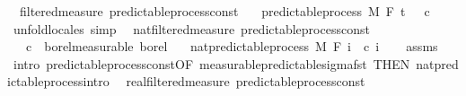 \begin{isabellebody}
%
\isadelimproof
\isanewline
%
\endisadelimproof
\isanewline
{}\isamarkupfalse%
\ {\isacharparenleft}{\kern0pt}\ filtered{\isacharunderscore}{\kern0pt}measure{\isacharparenright}{\kern0pt}\ predictable{\isacharunderscore}{\kern0pt}process{\isacharunderscore}{\kern0pt}const{\isacharprime}{\kern0pt}{\isacharcolon}{\kern0pt}\isanewline
\ \ \ {\isachardoublequoteopen}predictable{\isacharunderscore}{\kern0pt}process\ M\ F\ t\ {\isacharparenleft}{\kern0pt}{\isasymlambda}{\isacharunderscore}{\kern0pt}\ {\isacharunderscore}{\kern0pt}{\isachardot}{\kern0pt}\ c{\isacharparenright}{\kern0pt}{\isachardoublequoteclose}\isanewline
%
\isadelimproof
\ \ %
\endisadelimproof
%
\isatagproof
{}\isamarkupfalse%
\ {\isacharparenleft}{\kern0pt}unfold{\isacharunderscore}{\kern0pt}locales{\isacharparenright}{\kern0pt}\ simp%
\endisatagproof
{\isafoldproof}%
%
\isadelimproof
\isanewline
%
\endisadelimproof
\isanewline
{}\isamarkupfalse%
\ {\isacharparenleft}{\kern0pt}\ nat{\isacharunderscore}{\kern0pt}filtered{\isacharunderscore}{\kern0pt}measure{\isacharparenright}{\kern0pt}\ predictable{\isacharunderscore}{\kern0pt}process{\isacharunderscore}{\kern0pt}const{\isacharcolon}{\kern0pt}\isanewline
\ \ \ {\isachardoublequoteopen}c\ {\isasymin}\ borel{\isacharunderscore}{\kern0pt}measurable\ borel{\isachardoublequoteclose}\isanewline
\ \ \ {\isachardoublequoteopen}nat{\isacharunderscore}{\kern0pt}predictable{\isacharunderscore}{\kern0pt}process\ M\ F\ {\isacharparenleft}{\kern0pt}{\isasymlambda}i\ {\isacharunderscore}{\kern0pt}{\isachardot}{\kern0pt}\ c\ i{\isacharparenright}{\kern0pt}{\isachardoublequoteclose}\isanewline
%
\isadelimproof
\ \ %
\endisadelimproof
%
\isatagproof
{}\isamarkupfalse%
\ assms\ \isamarkupfalse%
\ {\isacharparenleft}{\kern0pt}intro\ predictable{\isacharunderscore}{\kern0pt}process{\isacharunderscore}{\kern0pt}const{\isacharbrackleft}{\kern0pt}OF\ measurable{\isacharunderscore}{\kern0pt}predictable{\isacharunderscore}{\kern0pt}sigma{\isacharunderscore}{\kern0pt}fst{\isacharcomma}{\kern0pt}\ THEN\ nat{\isacharunderscore}{\kern0pt}predictable{\isacharunderscore}{\kern0pt}process{\isachardot}{\kern0pt}intro{\isacharbrackright}{\kern0pt}{\isacharparenright}{\kern0pt}%
\endisatagproof
{\isafoldproof}%
%
\isadelimproof
\isanewline
%
\endisadelimproof
\isanewline
{}\isamarkupfalse%
\ {\isacharparenleft}{\kern0pt}\ real{\isacharunderscore}{\kern0pt}filtered{\isacharunderscore}{\kern0pt}measure{\isacharparenright}{\kern0pt}\ predictable{\isacharunderscore}{\kern0pt}process{\isacharunderscore}{\kern0pt}const{\isacharcolon}{\kern0pt}\isanewline

\end{isabellebody}
